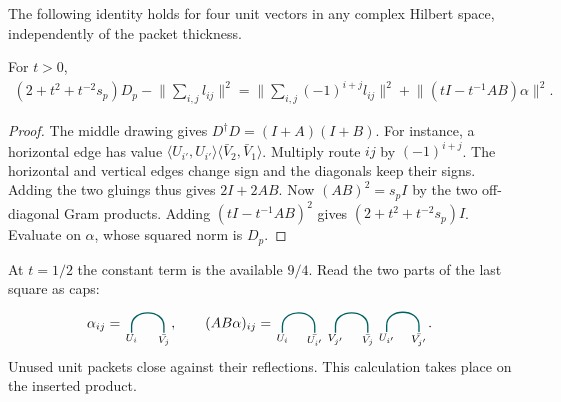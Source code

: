 \documentclass[a4paper,11pt]{amsart}
\numberwithin{equation}{subsection}
\theoremstyle{plain}
\theoremstyle{definition}
\newcommand{\CubScalarCap}[2]{\begin{tikzpicture}[x=4.8mm,y=4.1mm,baseline=(current bounding box.center),
every node/.style={font=\scriptsize,inner sep=1pt}]
\draw[draw=teal!75!black,line width=.95pt](0,0)--(0,.4)to[out=90,in=90,looseness=1.4](1.7,.4)--(1.7,0);
\node[below]at(0,0){$#1$};\node[below]at(1.7,0){$\bar{#2}$};
\end{tikzpicture}}
\begin{document}
The following identity holds for four unit vectors in any complex
Hilbert space, independently of the packet thickness.

\begin{lemma}
For $t>0$,
\begin{gather}\label{eq:cubic-signed}
(2+t^2+t^{-2}s_p)D_p-\Big\|\sum_{i,j}l_{ij}\Big\|^2
=\Big\|\sum_{i,j}(-1)^{i+j}l_{ij}\Big\|^2
+\Big\|(tI-t^{-1}AB)\alpha\Big\|^2.
\end{gather}
\end{lemma}

\begin{proof}
The middle drawing gives $D^\dagger D=(I+A)(I+B)$. For instance, a horizontal edge has value $\langle U_{i'},U_{i'}\rangle\langle\bar V_2,\bar V_1\rangle$. Multiply route $ij$ by $(-1)^{i+j}$. The horizontal and vertical edges change sign and the diagonals keep their signs. Adding the two gluings thus gives $2I+2AB$. Now $(AB)^2=s_pI$ by the two off-diagonal Gram products. Adding $(tI-t^{-1}AB)^2$ gives $(2+t^2+t^{-2}s_p)I$. Evaluate on $\alpha$, whose squared norm is $D_p$.
\end{proof}
At $t=1/2$ the constant term is the available $9/4$. Read the two parts of the last square as caps:
\[
\alpha_{ij}=\CubScalarCap{U_i}{V_j},\qquad
(AB\alpha)_{ij}=
\CubScalarCap{U_i}{U_{i'}}\,
\CubScalarCap{V_{j'}}{V_j}\,
\CubScalarCap{U_{i'}}{V_{j'}} .
\]
Unused unit packets close against their reflections. This calculation takes place on the inserted product.
\end{document}
